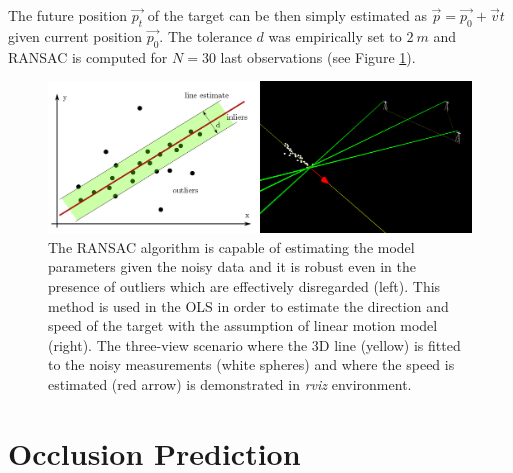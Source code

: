 The future position $\vec{p_{t}}$ of the target can be then simply estimated as $\vec{p} = \vec{p_{0}} + \vec{v}t$ given current position $\vec{p_{0}}$. The tolerance $d$ was empirically set to $2~m$ and RANSAC is computed for $N = 30$ last observations (see Figure \ref{fig:ransac}).

\begin{figure}[htb]
	\centering
	\includegraphics[width=0.8\linewidth]{fig/ransac_theory_rviz.png}
	\caption{The RANSAC algorithm is capable of estimating the model parameters given the noisy data and it is robust even in the presence of outliers which are effectively disregarded (left). This method is used in the OLS in order to estimate the direction and speed of the target with the assumption of linear motion model (right). The three-view scenario where the 3D line (yellow) is fitted to the noisy measurements (white spheres) and where the speed is estimated (red arrow) is demonstrated in \textit{rviz} environment.}
	\label{fig:ransac}
\end{figure}

\section{Occlusion Prediction} \label{txt:occlusion_prediction}



